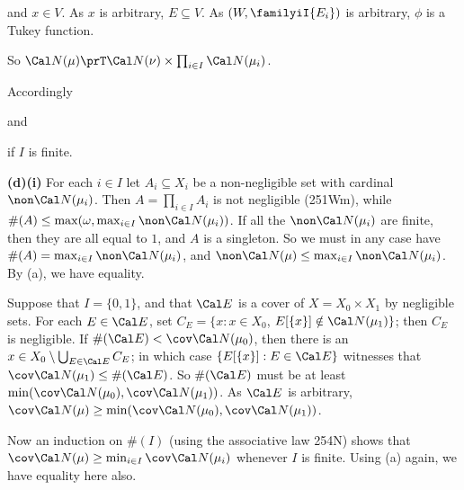 {

\noindent and $x\in V$.   As $x$ is arbitrary, $E\subseteq V$.   As
$(W,\familyiI{E_i})$ is arbitrary, $\phi$ is a Tukey function.\ \Qed

So $\Cal N(\mu)\prT\Cal N(\nu)\times\prod_{i\in I}\Cal N(\mu_i)$.

\medskip

 Accordingly


\noindent and


\noindent if $I$ is finite.

\medskip

{\bf (d)(i)} For each $i\in I$ let $A_i\subseteq X_i$ be a non-negligible
set with cardinal $\non\Cal N(\mu_i)$.   Then $A=\prod_{i\in I}A_i$ is not
negligible (251Wm), while
$\#(A)\le\max(\omega,\max_{i\in I}\non\Cal N(\mu_i))$.   If all the
$\non\Cal N(\mu_i)$ are finite, then they are all equal to $1$, and $A$ is
a singleton.   So we must in any case have
$\#(A)=\max_{i\in I}\non\Cal N(\mu_i)$, and
$\non\Cal N(\mu)\le\max_{i\in I}\non\Cal N(\mu_i)$.   By (a), we have
equality.

\medskip

 Suppose that $I=\{0,1\}$, and that $\Cal E$ is a cover of
$X=X_0\times X_1$ by negligible sets.   For each $E\in\Cal E$, set
$C_E=\{x:x\in X_0$, $E[\{x\}]\notin\Cal N(\mu_1)\}$;  then $C_E$ is
negligible.   If $\#(\Cal E)<\cov\Cal N(\mu_0)$, then there is an
$x\in X_0\setminus\bigcup_{E\in\Cal E}C_E$;  in which case
$\{E[\{x\}]:E\in\Cal E\}$ witnesses that $\cov\Cal N(\mu_1)\le\#(\Cal E)$.
So $\#(\Cal E)$ must be at least
$\min(\cov\Cal N(\mu_0),\cov\Cal N(\mu_1))$.   As $\Cal E$ is arbitrary,
$\cov\Cal N(\mu)\ge\min(\cov\Cal N(\mu_0),\cov\Cal N(\mu_1))$.

Now an induction on $\#(I)$ (using the associative law 254N) shows that
$\cov\Cal N(\mu)\ge\min_{i\in I}\cov\Cal N(\mu_i)$ whenever $I$ is finite.
Using (a) again, we have equality here also.
}%


